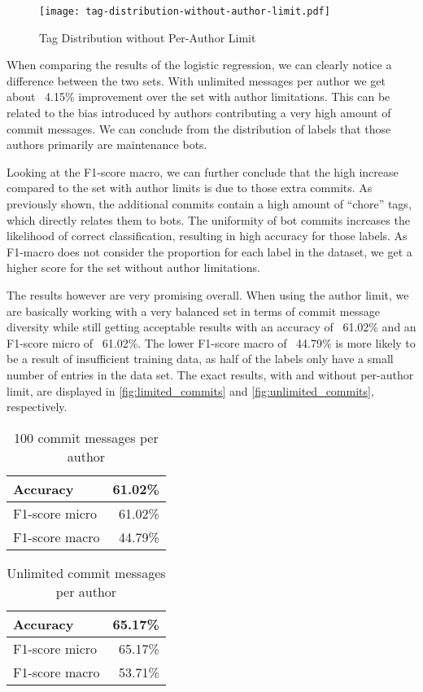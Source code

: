 \begin{figure}[H]
  \centering
  \texttt{[image: tag-distribution-without-author-limit.pdf]}
  \caption{Tag Distribution without Per-Author Limit}
  \label{fig:tag_dist_without_limit}
\end{figure}

When comparing the results of the logistic regression, we can clearly notice a difference between the two sets.
With unlimited messages per author we get about ~4.15\% improvement over the set with author limitations. This
can be related to the bias introduced by authors contributing a very high amount of commit messages. We can
conclude from the distribution of labels that those authors primarily are maintenance bots.

Looking at the F1-score macro, we can further conclude that the high increase compared to the set with author
limits is due to those extra commits. As previously shown, the additional commits contain a high amount of
“chore” tags, which directly relates them to bots. The uniformity of bot commits increases the likelihood
of correct classification, resulting in high accuracy for those labels. As F1-macro does not consider the
proportion for each label in the dataset, we get a higher score for the set without author limitations.

The results however are very promising overall. When using the author limit, we are basically working with a
very balanced set in terms of commit message diversity while still getting acceptable results with an accuracy
of ~61.02\% and an F1-score micro of ~61.02\%. The lower F1-score macro of ~44.79\% is more likely to be a
result of insufficient training data, as half of the labels only have a small number of entries in the data set.
The exact results, with and without per-author limit, are displayed in \autoref{fig:limited_commits}
and \autoref{fig:unlimited_commits}, respectively.

\begin{table}[H]
  \def\arraystretch{1.15}%
  \centering
  \begin{tabular}{|l|r|}
    \hline
    Accuracy       & 61.02\% \\
    \hline
    F1-score micro & 61.02\% \\
    \hline
    F1-score macro & 44.79\% \\
    \hline
  \end{tabular}
  \caption{100 commit messages per author}
  \label{fig:limited_commits}
\end{table}

\begin{table}[H]
  \def\arraystretch{1.15}%
  \centering
  \begin{tabular}{|l|r|}
    \hline
    Accuracy       & 65.17\% \\
    \hline
    F1-score micro & 65.17\% \\
    \hline
    F1-score macro & 53.71\% \\
    \hline
  \end{tabular}
  \caption{Unlimited commit messages per author}
  \label{fig:unlimited_commits}
\end{table}
